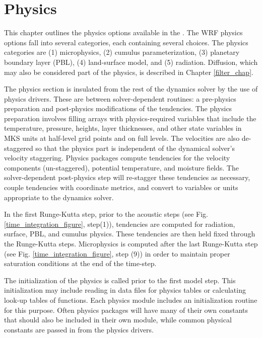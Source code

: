 \chapter{Physics}
\label{physics_chap}

This chapter
outlines the physics options available in the {\wrf}. 
The WRF physics options fall into several categories, each containing
several choices. The physics categories are (1) microphysics, 
(2) cumulus parameterization, (3) planetary boundary layer (PBL), 
(4) land-surface model, and (5) radiation. Diffusion, which
may also be considered part of the physics, 
is described in Chapter \ref{filter_chap}. 

The physics section is insulated from the rest of the dynamics solver by the 
use of physics drivers. These are between solver-dependent routines: a 
pre-physics preparation and post-physics 
modifications of the tendencies. The physics preparation involves filling
arrays with physics-required variables that include the temperature,
pressure, heights, layer thicknesses,
and other state variables in MKS units at half-level grid points and on full levels.
The velocities are also de-staggered so that the physics part is independent
of the dynamical solver's velocity staggering. Physics packages 
compute tendencies
for the velocity components (un-staggered), potential temperature, and moisture
fields. The solver-dependent post-physics step will re-stagger these tendencies
as necessary, couple tendencies with coordinate metrics, and convert
to variables or units appropriate to the dynamics solver.

In the first Runge-Kutta step, prior to the acoustic steps (see Fig.
\ref{time_integration_figure}, step(1)), tendencies are computed for
radiation, surface, PBL, and cumulus physics. These tendencies
are then held fixed through the Runge-Kutta steps. Microphysics is
computed after the last Runge-Kutta step 
(see Fig. \ref{time_integration_figure},
step (9)) in order to maintain proper saturation conditions at the end 
of the time-step.

The initialization of the physics is
called prior to the first model step. This initialization may include reading
in data files for physics tables or calculating look-up tables of functions.
Each physics module includes an initialization routine for this purpose.
Often physics packages will have many of their own constants that should also
be included in their own module, while common physical constants are
passed in from the physics drivers.


